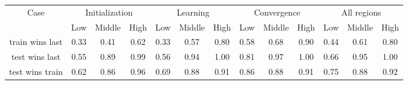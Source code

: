 \begin{tabular}{|c|ccc|ccc|ccc|ccc|}
\toprule
Case & \multicolumn{3}{c}{Initialization} & \multicolumn{3}{c}{Learning} & \multicolumn{3}{c}{Convergence} & \multicolumn{3}{c}{All regions} \\
 & Low & Middle & High & Low & Middle & High & Low & Middle & High & Low & Middle & High \\
\midrule
train wins last & 0.33 & 0.41 & 0.62 & 0.33 & 0.57 & 0.80 & 0.58 & 0.68 & 0.90 & 0.44 & 0.61 & 0.80 \\
test wins last & 0.55 & 0.89 & 0.99 & 0.56 & 0.94 & 1.00 & 0.81 & 0.97 & 1.00 & 0.66 & 0.95 & 1.00 \\
test wins train & 0.62 & 0.86 & 0.96 & 0.69 & 0.88 & 0.91 & 0.86 & 0.88 & 0.91 & 0.75 & 0.88 & 0.92 \\
\bottomrule
\end{tabular}
